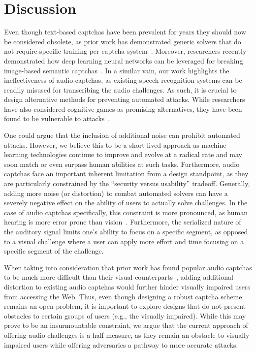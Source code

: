 \section{Discussion}
\label{sec:discussion}

Even though text-based captchas have been prevalent for years they should now be considered
obsolete, as prior work has demonstrated generic solvers that do not require specific training per captcha system~\cite{185128}.
Moreover, researchers recently demonstrated how deep learning neural networks can be leveraged for breaking image-based 
semantic captchas~\cite{sivakorn:eurosp16}. In a similar vain, our work highlights the ineffectiveness of audio 
captchas, as existing speech recognition systems can be readily misused for transcribing the audio challenges.
As such, it is crucial to design alternative methods for preventing automated attacks. While researchers 
have also considered cognitive games as promising alternatives, they have been found to be vulnerable to 
attacks~\cite{mohamed2017security}.

One could argue that the inclusion of additional noise can prohibit automated attacks. However, we believe this to be
a short-lived approach as machine learning technologies continue to improve and evolve at a radical rate and may soon
match or even surpass human abilities at such tasks.
Furthermore, audio captchas face an important inherent limitation from a design standpoint, as they are particularly
constrained by the ``security versus usability'' tradeoff. Generally, adding more noise (or distortion) 
to combat automated solvers can have a severely negative effect on the ability of users to actually solve challenges.
In the case of audio captchas specifically, this constraint is more pronounced, as human hearing is more error prone 
than vision~\cite{o2009auditory,shinn2008object}. Furthermore, the serialized nature of the auditory signal limits 
one's ability to focus on a specific segment, as opposed to a visual challenge where a user can apply more effort and 
time focusing on a specific segment of the challenge.

When taking into consideration that prior work has found popular audio captchas to be much more difficult 
than their visual counterparts~\cite{bigham2009evaluating,captchas-are-hard},
adding additional distortion to existing audio captchas would further hinder visually impaired users from accessing the Web.
Thus, even though designing a robust captcha scheme remains an open problem, it is important 
to explore designs that do not present obstacles to certain groups of users (e.g., the visually impaired).
While this may prove to be an insurmountable constraint, we argue that the current approach of offering audio
challenges is a half-measure, as they remain an obstacle to visually impaired users while offering 
adversaries a pathway to more accurate attacks.
